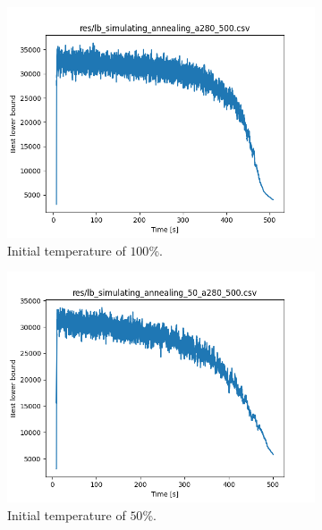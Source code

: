 \begin{figure}[!h]
	\begin{subfigure}{.5\columnwidth}
		\centering
		\includegraphics[width=\columnwidth]{../res/lb_simulating_annealing_100_a280_500.png}
		\caption{Initial temperature of $100$\%.}
		\label{fig:sim_ann_100}
	\end{subfigure}
	\begin{subfigure}{.5\columnwidth}
		\centering
		\includegraphics[width=\columnwidth]{../res/lb_simulating_annealing_50_a280_500.png}
		\caption{Initial temperature of $50$\%.}
		\label{fig:sim_ann_50}
	\end{subfigure}
	\begin{subfigure}{.5\columnwidth}

\end{subfigure}
\end{figure}
